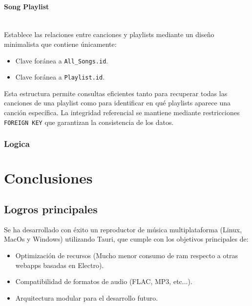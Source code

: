 \documentclass[11pt, a4paper]{article}
\begin{document}
              \paragraph{Song Playlist}
              ‎ \\

              Establece las relaciones entre canciones y playlists mediante un diseño minimalista que contiene únicamente:

              \begin{itemize}
                \item Clave foránea a \verb|All_Songs.id|.
                \item Clave foránea a \verb|Playlist.id|.
              \end{itemize}

              Esta estructura permite consultas eficientes tanto para recuperar todas las canciones de una playlist como para identificar en qué playlists aparece una canción específica. La integridad referencial se mantiene mediante restricciones \verb|FOREIGN KEY| que garantizan la consistencia de los datos.

            \subsubsection{Logica}

\section{Conclusiones}

        \subsection{Logros principales}

        Se ha desarrollado con éxito un reproductor de música multiplataforma (Linux, MacOs y Windows) utilizando Tauri, que cumple con los objetivos principales de:

        \begin{itemize}
            \item Optimización de recursos (Mucho menor consumo de ram respecto a otras webapps basadas en Electro).
            \item Compatibilidad de formatos de audio (FLAC, MP3, etc...).
            \item Arquitectura modular para el desarrollo futuro.
        \end{itemize}
\end{document}
